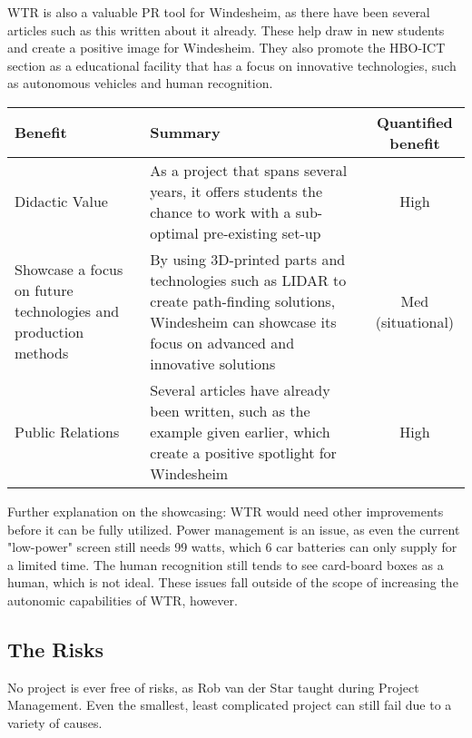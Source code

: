 WTR is also a valuable PR tool for Windesheim, as there have been several articles such as this \cite{stentorwilly} written about it already.
These help draw in new students and create a positive image for Windesheim.
They also promote the HBO-ICT section as a educational facility that has a focus on innovative technologies, such as autonomous vehicles and human recognition.

\begin{tabular}{|L{6cm}|L{6cm}|c|}
\hline
Benefit & Summary & Quantified benefit \\ \hline
Didactic Value & As a project that spans several years, it offers students the chance to work with a sub-optimal pre-existing set-up & High \\ \hline
Showcase a focus on future technologies and production methods & By using 3D-printed parts and technologies such as LIDAR to create path-finding solutions, Windesheim can showcase its focus on advanced and innovative solutions & Med (situational) \\ \hline
Public Relations & Several articles have already been written, such as the example given earlier, which create a positive spotlight for Windesheim & High \\ \hline
\end{tabular}

Further explanation on the showcasing: WTR would need other improvements before it can be fully utilized.
Power management is an issue, as even the current "low-power" screen still needs 99 watts, which 6 car batteries can only supply for a limited time.
The human recognition still tends to see card-board boxes as a human, which is not ideal.
These issues fall outside of the scope of increasing the autonomic capabilities of WTR, however.

\clearpage
\subsection{The Risks}
No project is ever free of risks, as Rob van der Star taught during Project Management.
Even the smallest, least complicated project can still fail due to a variety of causes.

